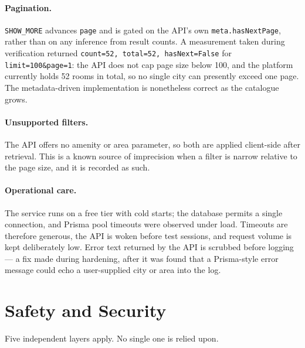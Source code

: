 \documentclass[11pt,a4paper]{article}
\newcommand{\fn}[1]{\texttt{\small #1}}
\begin{document}
\paragraph{Pagination.} \fn{SHOW\_MORE} advances \fn{page} and is gated on the API's own
\fn{meta.hasNextPage}, rather than on any inference from result counts. A measurement taken
during verification returned \fn{count=52, total=52, hasNext=False} for
\fn{limit=100\&page=1}: the API does not cap page size below 100, and the platform currently
holds 52 rooms in total, so no single city can presently exceed one page. The metadata-driven
implementation is nonetheless correct as the catalogue grows.

\paragraph{Unsupported filters.} The API offers no amenity or area parameter, so both are
applied client-side after retrieval. This is a known source of imprecision when a filter is
narrow relative to the page size, and it is recorded as such.

\paragraph{Operational care.} The service runs on a free tier with cold starts; the database
permits a single connection, and Prisma pool timeouts were observed under load. Timeouts are
therefore generous, the API is woken before test sessions, and request volume is kept
deliberately low. Error text returned by the API is scrubbed before logging --- a fix made
during hardening, after it was found that a Prisma-style error message could echo a
user-supplied city or area into the log.

\section{Safety and Security}
\label{sec:safety}

Five independent layers apply. No single one is relied upon.
\end{document}
